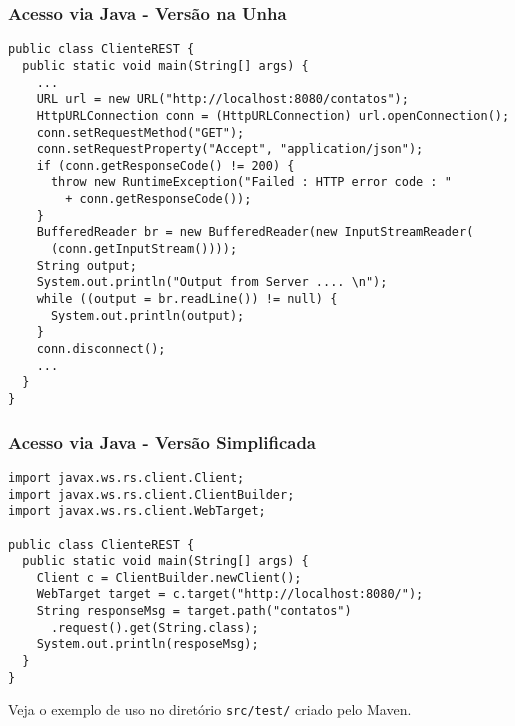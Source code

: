 \documentclass[Ligatures=TeX,table,brazil,svgnames,usetotalslideindicator,comp
ress,10pt]{beamer}
\begin{document}
\begin{frame}[fragile]
  \frametitle{Acesso via Java - Versão na Unha}
{\footnotesize
\begin{verbatim}
public class ClienteREST {
  public static void main(String[] args) {
    ...
    URL url = new URL("http://localhost:8080/contatos");
    HttpURLConnection conn = (HttpURLConnection) url.openConnection();
    conn.setRequestMethod("GET");
    conn.setRequestProperty("Accept", "application/json");
    if (conn.getResponseCode() != 200) {
      throw new RuntimeException("Failed : HTTP error code : "
        + conn.getResponseCode());
    }
    BufferedReader br = new BufferedReader(new InputStreamReader(
      (conn.getInputStream())));
    String output;
    System.out.println("Output from Server .... \n");
    while ((output = br.readLine()) != null) {
      System.out.println(output);
    }
    conn.disconnect();
    ...
  }
}
\end{verbatim}
}
\end{frame}


\begin{frame}[fragile]
  \frametitle{Acesso via Java - Versão Simplificada}
{\footnotesize
\begin{verbatim}
import javax.ws.rs.client.Client;
import javax.ws.rs.client.ClientBuilder;
import javax.ws.rs.client.WebTarget;

public class ClienteREST {
  public static void main(String[] args) {
    Client c = ClientBuilder.newClient();
    WebTarget target = c.target("http://localhost:8080/");
    String responseMsg = target.path("contatos")
      .request().get(String.class);
    System.out.println(resposeMsg);
  }
}
\end{verbatim}
}

Veja o exemplo de uso no diretório \texttt{src/test/} criado pelo Maven.
\end{frame}
\end{document}
